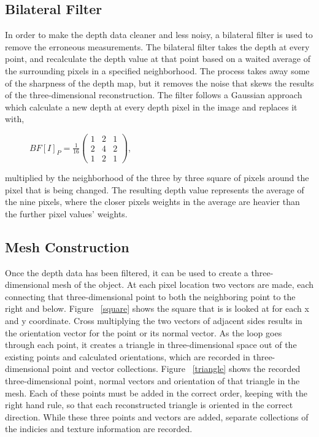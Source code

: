 \documentclass[pdftex,10.5pt]{report}
\begin{document}
\subsection{Bilateral Filter}
In order to make the depth data cleaner and less noisy, a bilateral filter is used to remove the erroneous measurements. The bilateral filter takes the depth at every point, and recalculate the depth value at that point based on a waited average of the surrounding pixels in a specified neighborhood. The process takes away some of the sharpness of the depth map, but it removes the noise that skews the results of the three-dimensional reconstruction. The filter follows a Gaussian approach which calculate a new depth at every depth pixel in the image and replaces it with,
\begin{figure}[H]
	\centering
	$BF[I]_{P} = \frac{1}{16} \left( 
	\begin{array}{ccc}
		1 & 2 & 1 \\
		2 & 4 & 2 \\
		1 & 2 & 1 
	\end{array}  \right)$,
\end{figure}
\noindent multiplied by the neighborhood of the three by three square of pixels around the pixel that is being changed. The resulting depth value represents the average of the nine pixels, where the closer pixels weights in the average are heavier than the further pixel values' weights.  \cite{filter}

\subsection{Mesh Construction}
Once the depth data has been filtered, it can be used to create a three-dimensional mesh of the object. At each pixel location two vectors are made, each connecting that three-dimensional point to both the neighboring point to the right and below. Figure ~\ref{square} shows the square that is is looked at for each x and y coordinate. Cross multiplying the two vectors of adjacent sides results in the orientation vector for the point or its normal vector. As the loop goes through each point, it creates a triangle in three-dimensional space out of the existing points and calculated orientations, which are recorded in three-dimensional point and vector collections. Figure ~\ref{triangle} shows the recorded three-dimensional point, normal vectors and orientation of that triangle in the mesh. Each of these points must be added in the correct order, keeping with the right hand rule, so that each reconstructed triangle is oriented in the correct direction. While these three points and vectors are added, separate collections of the indicies and texture information are recorded. 
\end{document}
